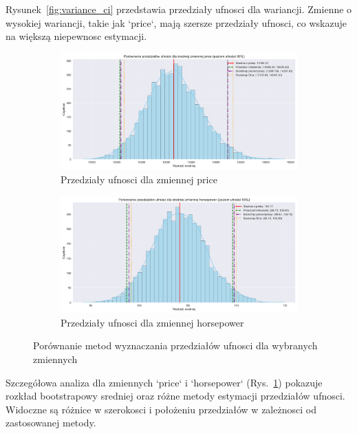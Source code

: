 \documentclass[12pt,a4paper]{article}
\begin{document}
Rysunek~\ref{fig:variance_ci} przedstawia przedziały ufnosci dla wariancji. Zmienne o wysokiej wariancji, takie jak `price`, mają szersze przedziały ufnosci, co wskazuje na większą niepewnosc estymacji.

\begin{figure}[H]
    \centering
    \begin{subfigure}[b]{0.48\textwidth}
        \includegraphics[width=\textwidth]{figures/ci_comparison_price.png}
        \caption{Przedziały ufnosci dla zmiennej price}
    \end{subfigure}
    \hfill
    \begin{subfigure}[b]{0.48\textwidth}
        \includegraphics[width=\textwidth]{figures/ci_comparison_horsepower.png}
        \caption{Przedziały ufnosci dla zmiennej horsepower}
    \end{subfigure}
    \caption{Porównanie metod wyznaczania przedziałów ufnosci dla wybranych zmiennych}
    \label{fig:ci_comparison_selected}
\end{figure}

Szczegółowa analiza dla zmiennych `price` i `horsepower` (Rys.~\ref{fig:ci_comparison_selected}) pokazuje rozkład bootstrapowy sredniej oraz różne metody estymacji przedziałów ufnosci. Widoczne są różnice w szerokosci i położeniu przedziałów w zależnosci od zastosowanej metody.
\end{document}
